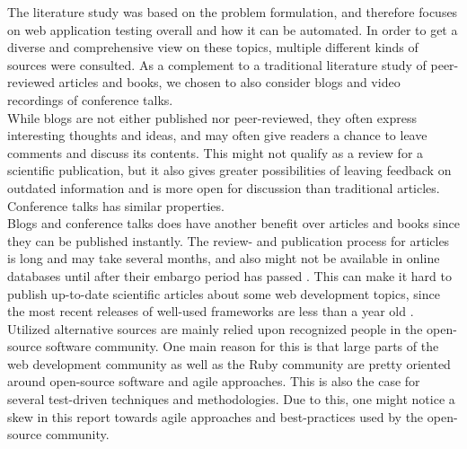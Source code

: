 
The literature study was based on the problem formulation, and therefore
focuses on web application testing overall and how it can be automated.
In order to get a diverse and comprehensive view on these topics,
multiple different kinds of sources were consulted. As a
complement to a traditional literature study of peer-reviewed articles
and books, we chosen to also consider blogs and video recordings of
conference talks.\\

While blogs are not either published nor peer-reviewed, they often
express interesting thoughts and ideas, and may often give readers a
chance to leave comments and discuss its contents. This might not
qualify as a review for a scientific publication, but it also gives
greater possibilities of leaving feedback on outdated information and
is more open for discussion than traditional articles. Conference
talks has similar properties.\\

Blogs and conference talks does have another benefit over articles and
books since they can be published instantly. The review- and publication
process for articles is long and may take several months, and also might
not be available in online databases until after their embargo period
has passed \cite{wiki:embargo, pdf:publishing}. This can make it hard to
publish up-to-date scientific articles about some web development
topics, since the most recent releases of well-used frameworks are less
than a year old \cite{wiki:rails_versions, wiki:django_versions,
web:knockout_versions}.\\

Utilized alternative sources are mainly relied upon recognized people in
the open-source software community. One main reason for this is that
large parts of the web development community as well as the Ruby
community are pretty oriented around open-source software and agile
approaches. This is also the case for several test-driven techniques and
methodologies. Due to this, one might notice a skew in this report
towards agile approaches and best-practices used by the open-source
community.\\
